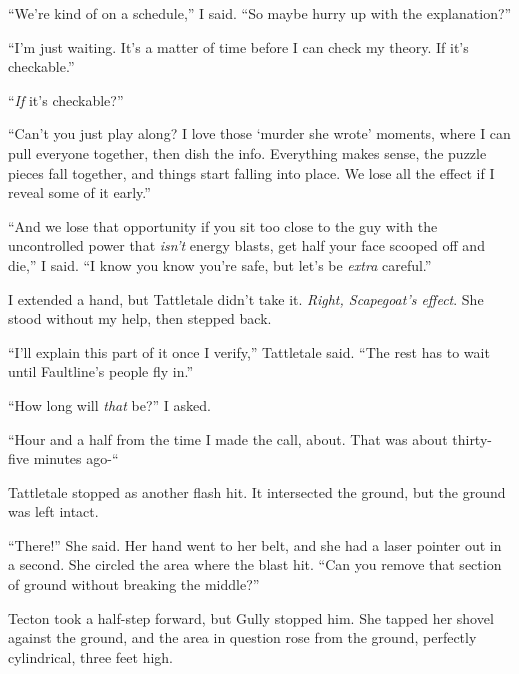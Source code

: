 ``We're kind of on a schedule,'' I said.  ``So maybe hurry up with the explanation?''



``I'm just waiting.  It's a matter of time before I can check my theory.  If it's checkable.''



``\emph{If} it's checkable?''



``Can't you just play along?  I love those `murder she wrote' moments, where I can pull everyone together, then dish the info.  Everything makes sense, the puzzle pieces fall together, and things start falling into place.  We lose all the effect if I reveal some of it early.''



``And we lose that opportunity if you sit too close to the guy with the uncontrolled power that \emph{isn't} energy blasts, get half your face scooped off and die,'' I said.  ``I know you know you're safe, but let's be \emph{extra} careful.''



I extended a hand, but Tattletale didn't take it.  \emph{Right, Scapegoat's effect}.  She stood without my help, then stepped back.



``I'll explain this part of it once I verify,'' Tattletale said.  ``The rest has to wait until Faultline's people fly in.''



``How long will \emph{that} be?'' I asked.



``Hour and a half from the time I made the call, about.  That was about thirty-five minutes ago-``



Tattletale stopped as another flash hit.  It intersected the ground, but the ground was left intact.



``There!''  She said.  Her hand went to her belt, and she had a laser pointer out in a second.  She circled the area where the blast hit.  ``Can you remove that section of ground without breaking the middle?''



Tecton took a half-step forward, but Gully stopped him.  She tapped her shovel against the ground, and the area in question rose from the ground, perfectly cylindrical, three feet high.



